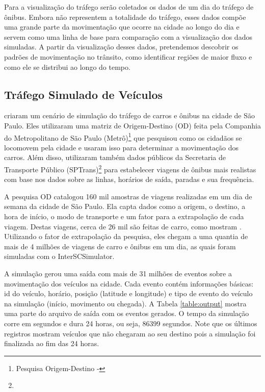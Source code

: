 Para a visualização do tráfego serão coletados os dados de um dia do tráfego
de ônibus. Embora não representem a totalidade do tráfego, esses dados compõe uma
grande parte da movimentação que ocorre na cidade ao longo do dia e servem como
uma linha de base para comparação com a visualização dos dados simuladas. A partir
da visualização desses dados, pretendemos descobrir os padrões de movimentação
no trânsito, como identificar regiões de maior fluxo e como ele se distribui ao longo
do tempo.

\subsection{Tráfego Simulado de Veículos}
 \citet{santana2018courb} criaram um cenário de simulação do tráfego de carros
e ônibus na cidade de São Paulo. Eles utilizaram uma matriz de Origem-Destino
(OD) feita pela Companhia do Metropolitano de São Paulo
(Metrô)\footnote{Pesquisa Origem-Destino - } que pesquisou
como os cidadãos se locomovem pela cidade e usaram isso para determinar a
movimentação dos carros. Além disso, utilizaram também dados públicos da
Secretaria de Transporte Público (SPTrans)\footnote{} para
estabelecer viagens de ônibus mais realistas com base nos dados sobre as
linhas, horários de saída, paradas e sua frequência.

  A pesquisa OD catalogou 160 mil amostras de viagens realizadas em um dia de
semana da cidade de São Paulo. Ela capta dados como a origem, o destino, a hora
de início, o modo de transporte e um fator para a extrapolação de cada viagem.
Destas viagens, cerca de 26 mil são feitas de carro, como mostram
\citet{santana2018courb}. Utilizando o fator de extrapolação da pesquisa, eles
chegam a uma quantia de mais de 4 milhões de viagens de carro e ônibus em um
dia, as quais foram simuladas com o InterSCSimulator.

  A simulação gerou uma saída com mais de 31 milhões de eventos sobre a
movimentação dos veículos na cidade.  Cada evento contém informações básicas:
id do veículo, horário, posição (latitude e longitude) e tipo de evento do
veículo na simulação (início, movimento ou chegada). A Tabela
\ref{table:output} mostra uma parte do arquivo de saída com os eventos gerados.
O tempo da simulação corre em segundos e dura 24 horas, ou seja, 86399
segundos.  Note que os últimos registros mostram veículos que não chegaram ao
seu destino pois a simulação foi finalizada ao fim das 24 horas.

